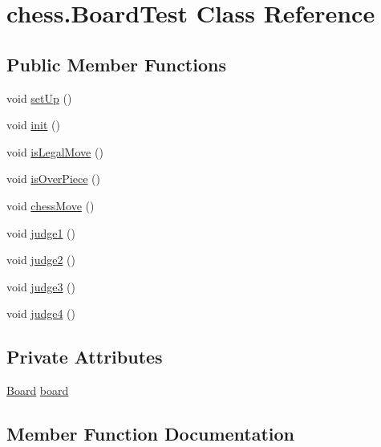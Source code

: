 \hypertarget{classchess_1_1_board_test}{}\section{chess.\+Board\+Test Class Reference}
\label{classchess_1_1_board_test}
\subsection*{Public Member Functions}
\begin{DoxyCompactItemize}
\item 
void \mbox{\hyperlink{classchess_1_1_board_test_acd0ea30fd3e9742c6b71a5ee60b65707}{set\+Up}} ()
\item 
void \mbox{\hyperlink{classchess_1_1_board_test_a74abc15f67e30a9464758c1bf5dccbff}{init}} ()
\item 
void \mbox{\hyperlink{classchess_1_1_board_test_abd189ec57b7236f5482df6d2121898e6}{is\+Legal\+Move}} ()
\item 
void \mbox{\hyperlink{classchess_1_1_board_test_a844fc9d2b643df169a9b74a1983ce9ba}{is\+Over\+Piece}} ()
\item 
void \mbox{\hyperlink{classchess_1_1_board_test_ad2614964ffa53b71ba2cccc28e103132}{chess\+Move}} ()
\item 
void \mbox{\hyperlink{classchess_1_1_board_test_a61544e4031a24421423696beafba0022}{judge1}} ()
\item 
void \mbox{\hyperlink{classchess_1_1_board_test_a121d3fd4216f8b9cc947dff29a6f8dc9}{judge2}} ()
\item 
void \mbox{\hyperlink{classchess_1_1_board_test_a34e4acc21cdd11b3030d00a6d183c210}{judge3}} ()
\item 
void \mbox{\hyperlink{classchess_1_1_board_test_ac6238a4f2c53d80beb75fd43eb0aa754}{judge4}} ()
\end{DoxyCompactItemize}
\subsection*{Private Attributes}
\begin{DoxyCompactItemize}
\item 
\mbox{\hyperlink{classchess_1_1models_1_1_board}{Board}} \mbox{\hyperlink{classchess_1_1_board_test_a678a57765fd143e9c65eb0c6f741221c}{board}}
\end{DoxyCompactItemize}


\subsection{Member Function Documentation}
\mbox{\label{classchess_1_1_board_test_ad2614964ffa53b71ba2cccc28e103132}} 
